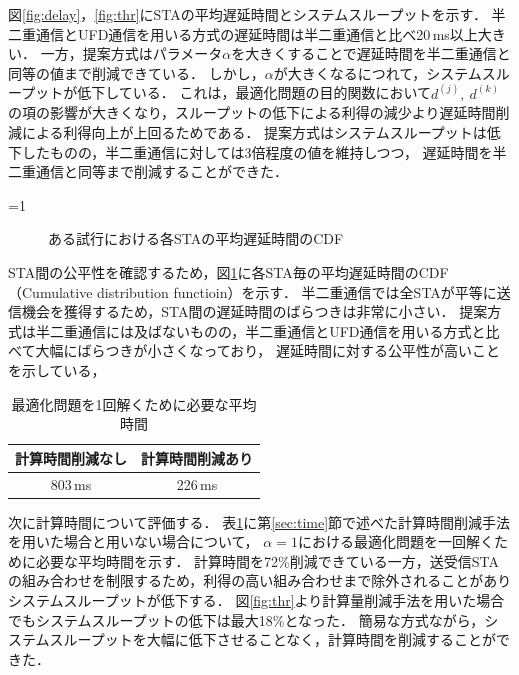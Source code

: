 \documentclass[master]{kuisthesis}		%
\newcounter{flagFig}
\begin{document}
			\par
			図\ref{fig:delay}，\ref{fig:thr}にSTAの平均遅延時間とシステムスループットを示す．
			半二重通信とUFD通信を用いる方式の遅延時間は半二重通信と比べ20\,ms以上大きい．
			一方，提案方式はパラメータ$\alpha$を大きくすることで遅延時間を半二重通信と同等の値まで削減できている．
			しかし，$\alpha$が大きくなるにつれて，システムスループットが低下している．
			これは，最適化問題の目的関数において$d^{(j)},\ d^{(k)}$の項の影響が大きくなり，スループットの低下による利得の減少より遅延時間削減による利得向上が上回るためである．
			提案方式はシステムスループットは低下したものの，半二重通信に対しては3倍程度の値を維持しつつ，
			遅延時間を半二重通信と同等まで削減することができた．
			\par
			\ifnum\value{flagFig}=1 {\begin{figure}[t]
				\centering
				\caption{ある試行における各STAの平均遅延時間のCDF}
				\label{fig:cdf}
			\end{figure}}\fi
			STA間の公平性を確認するため，図\ref{fig:cdf}に各STA毎の平均遅延時間のCDF（Cumulative distribution functioin）を示す．
			半二重通信では全STAが平等に送信機会を獲得するため，STA間の遅延時間のばらつきは非常に小さい．
			提案方式は半二重通信には及ばないものの，半二重通信とUFD通信を用いる方式と比べて大幅にばらつきが小さくなっており，
			遅延時間に対する公平性が高いことを示している，



			\par
			\begin{table}[t]
				\centering
				\caption{最適化問題を1回解くために必要な平均時間}
				\label{tab:time}
				\begin{tabular}{cc}
			 	計算時間削減なし & 計算時間削減あり\\ \hline
				803\,ms & 226\,ms \\\hline
				\end{tabular}
			\end{table}
			次に計算時間について評価する．
			表\ref{tab:time}に第\ref{sec:time}節で述べた計算時間削減手法を用いた場合と用いない場合について，
			$\alpha=1$における最適化問題を一回解くために必要な平均時間を示す．
			計算時間を72\%削減できている一方，送受信STAの組み合わせを制限するため，利得の高い組み合わせまで除外されることがありシステムスループットが低下する．
			図\ref{fig:thr}より計算量削減手法を用いた場合でもシステムスループットの低下は最大18\%となった．
			簡易な方式ながら，システムスループットを大幅に低下させることなく，計算時間を削減することができた．
\end{document}
